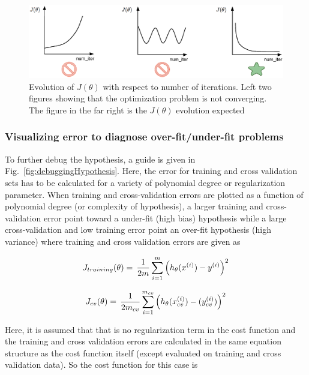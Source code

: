 \begin{figure}
\begin{center}
\includegraphics[width=15cm]{figures/visualizeCostFunc}    %
\caption{Evolution of $J(\theta)$ with respect to number of iterations. Left two figures showing that the optimization problem is not converging. The figure in the far right is the $J(\theta)$ evolution expected} 
\label{fig:visualizeCostFunc}
\end{center}
\end{figure}

\subsubsection{Visualizing error to diagnose over-fit/under-fit problems}

To further debug the hypothesis, a guide is given in Fig.~\ref{fig:debuggingHypothesis}. 
Here, the error for training and cross validation sets has to be calculated for a variety of polynomial degree or regularization parameter. 
When training and cross-validation errors are plotted as a function of polynomial degree (or complexity of hypothesis), a larger training and cross-validation error point toward a under-fit (high bias) hypothesis while a large cross-validation and low training error point an over-fit hypothesis (high variance) where training and cross validation errors are given as

\begin{equation}{\label{eqn:trainingError}}
J_{training}(\theta)
=\,
\frac{1}{2m} \sum\limits_{i=1}^{m} \Big(h_\theta(x^{(i)}) - y^{(i)}\Big)^2  
\end{equation} 

\begin{equation}{\label{eqn:crossvalError}}
J_{cv}(\theta)
=\,
\frac{1}{2m_{cv}} \sum\limits_{i=1}^{m_{cv}} \Big(h_\theta(x_{cv}^{(i)}) - (y_{cv}^{(i)})\Big)^2  
\end{equation} 

Here, it is assumed that that is no regularization term in the cost function and the training and cross validation errors are calculated in the same equation structure as the cost function itself (except evaluated on training and cross validation data). 
So the cost function for this case is

